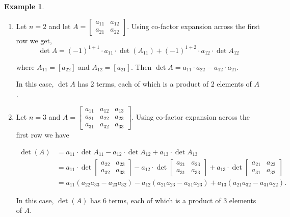 \documentclass[12pt]{article}
\theoremstyle{definition}
\newtheorem*{example}{Example}
\begin{document}
\begin{example} $ $
\begin{enumerate}[label = (\arabic*)]
\item Let $n = 2$ and let 
$\displaystyle A = \begin{bmatrix} a_{11} & a_{12} \\ a_{21} & a_{22} \end{bmatrix}$.
Using co-factor expansion across the first row we get,
\[\det A = (-1)^{1 + 1} \cdot a_{11} \cdot \det (A_{11}) + (-1)^{1 + 2} \cdot a_{12} \cdot \det A_{12}\]

where $A_{11} = [a_{22}]$ and $A_{12} = [a_{21}]$. Then 
$\det A = a_{11} \cdot a_{22} - a_{12} \cdot a_{21}$.

In this case, $\det A$ has 2 terms, each of which is a product of 2 elements of $A$.

\item Let $n = 3$ and $\displaystyle A = \begin{bmatrix} a_{11} & a_{12} & a_{13} \\
a_{21} & a_{22} & a_{23} \\ a_{31} & a_{32} & a_{33} \end{bmatrix}$. Using co-factor
expansion across the first row we have

\begin{align*}
\det(A) &= a_{11} \cdot \det A_{11} - a_{12} \cdot \det A_{12} + a_{13} \cdot \det A_{13} \\
&= a_{11} \cdot \det \begin{bmatrix} a_{22} & a_{23} \\ a_{32} & a_{33} \end{bmatrix} -
a_{12} \cdot \det \begin{bmatrix} a_{21} & a_{23} \\ a_{31} & a_{33} \end{bmatrix} +
a_{13} \cdot \det \begin{bmatrix} a_{21} & a_{22} \\ a_{31} & a_{32} \end{bmatrix} \\
&= a_{11}(a_{22}a_{33}- a_{23}a_{32}) - a_{12}(a_{21}a_{23} - a_{31}a_{23}) +
a_{13}(a_{21}a_{32}- a_{31}a_{22}).
\end{align*}

In this case, $\det(A)$ has 6 terms, each of which is a product of 3 elements of $A$.
\end{enumerate}
\end{example}
\end{document}
